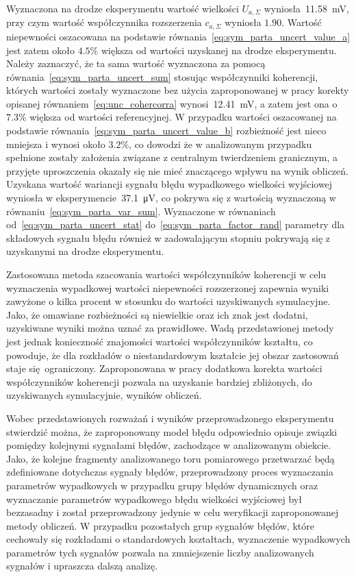 Wyznaczona na drodze eksperymentu wartość wielkości $U_{a,\Sigma}$ wyniosła~\qty{11.58}{mV}, przy czym wartość współczynnika rozszerzenia $c_{a,\Sigma}$ wyniosła $1.90$. Wartość niepewności oszacowana na podstawie równania~\eqref{eq:sym_parta_uncert_value_a} jest zatem około $4.5\%$ większa od wartości uzyskanej na drodze eksperymentu. Należy zaznaczyć, że ta sama wartość wyznaczona za pomocą równania~\eqref{eq:sym_parta_uncert_sum} stosując współczynniki koherencji, których wartości zostały wyznaczone bez użycia zaproponowanej w pracy korekty opisanej równaniem~\eqref{eq:unc_cohercorra} wynosi~\qty{12.41}{mV}, a zatem jest ona o $7.3\%$ większa od wartości referencyjnej. W przypadku wartości oszacowanej na podstawie równania~\eqref{eq:sym_parta_uncert_value_b} rozbieżność jest nieco mniejsza i wynosi około $3.2\%$, co dowodzi że w analizowanym przypadku spełnione zostały założenia związane z centralnym twierdzeniem granicznym, a przyjęte uproszczenia okazały się nie mieć znaczącego wpływu na wynik obliczeń. Uzyskana wartość wariancji sygnału błędu wypadkowego wielkości wyjściowej wyniosła w eksperymencie~\qty{37.1}{\micro V}, co pokrywa się z wartością wyznaczoną w równaniu~\eqref{eq:sym_parta_var_sum}. Wyznaczone w równaniach od~\eqref{eq:sym_parta_uncert_stat} do~\eqref{eq:sym_parta_factor_rand} parametry dla składowych sygnału błędu również w zadowalającym stopniu pokrywają się z uzyskanymi na drodze eksperymentu.

Zastosowana metoda szacowania wartości współczynników koherencji w celu wyznaczenia wypadkowej wartości niepewności rozszerzonej zapewnia wyniki zawyżone o kilka procent w stosunku do wartości uzyskiwanych symulacyjne. Jako, że omawiane rozbieżności są niewielkie oraz ich znak jest dodatni, uzyskiwane wyniki można uznać za prawidłowe. Wadą przedstawionej metody jest jednak konieczność znajomości wartości współczynników kształtu, co powoduje, że dla rozkładów o niestandardowym kształcie jej obszar zastosowań staje się ograniczony. Zaproponowana w pracy dodatkowa korekta wartości współczynników koherencji pozwala na uzyskanie bardziej zbliżonych, do uzyskiwanych symulacyjnie, wyników obliczeń.

Wobec przedstawionych rozważań i wyników przeprowadzonego eksperymentu stwierdzić można, że zaproponowany model błędu odpowiednio opisuje związki pomiędzy kolejnymi sygnałami błędów, zachodzące w analizowanym obiekcie. Jako, że kolejne fragmenty analizowanego toru pomiarowego przetwarzać będą zdefiniowane dotychczas sygnały błędów, przeprowadzony proces wyznaczania parametrów wypadkowych w przypadku grupy błędów dynamicznych oraz wyznaczanie parametrów wypadkowego błędu wielkości wyjściowej był bezzasadny i został przeprowadzony jedynie w celu weryfikacji zaproponowanej metody obliczeń. W przypadku pozostałych grup sygnałów błędów, które cechowały się rozkładami o standardowych kształtach, wyznaczenie wypadkowych parametrów tych sygnałów pozwala na zmniejszenie liczby analizowanych sygnałów i upraszcza dalszą analizę.

